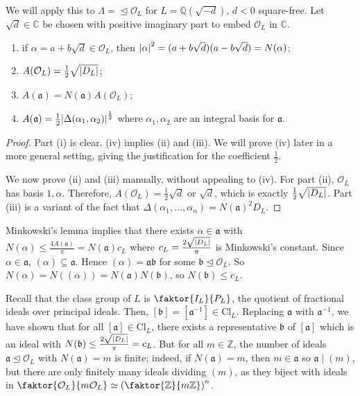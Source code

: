 We will apply this to \( \Lambda = \mathfrak \trianglelefteq \mathcal O_L \) for \( L = \mathbb Q(\sqrt{-d}) \), \( d < 0 \) square-free.
Let \( \sqrt{d} \in \mathbb C \) be chosen with positive imaginary part to embed \( \mathcal O_L \) in \( \mathbb C \).
\begin{lemma}
    \begin{enumerate}
        \item if \( \alpha = a + b \sqrt{d} \in \mathcal O_L \), then \( \abs{\alpha}^2 = (a+b\sqrt{d})(a-b\sqrt{d}) = N(\alpha) \);
        \item \( A(\mathcal O_L) = \frac{1}{2}\sqrt{\abs{D_L}} \);
        \item \( A(\mathfrak a) = N(\mathfrak a) A(\mathcal O_L) \);
        \item \( A(\mathfrak a) = \frac{1}{2} \abs{\Delta(\alpha_1, \alpha_2)}^{\frac{1}{2}} \) where \( \alpha_1, \alpha_2 \) are an integral basis for \( \mathfrak a \).
    \end{enumerate}
\end{lemma}
\begin{proof}
    Part (i) is clear.
    (iv) implies (ii) and (iii).
    We will prove (iv) later in a more general setting, giving the justification for the coefficient \( \frac{1}{2} \).
    
    We now prove (ii) and (iii) manually, without appealing to (iv).
    For part (ii), \( \mathcal O_L \) has basis \( 1, \alpha \).
    Therefore, \( A(\mathcal O_L) = \frac{1}{2}\sqrt{d} \) or \( \sqrt{d} \), which is exactly \( \frac{1}{2} \sqrt{\abs{D_L}} \).
    Part (iii) is a variant of the fact that \( \Delta(\alpha_1, \dots, \alpha_n) = N(\mathfrak a)^2 D_L \).
\end{proof}
Minkowski's lemma implies that there exists \( \alpha \in \mathfrak a \) with \( N(\alpha) \leq \frac{4A(\mathfrak a)}{\pi} = N(\mathfrak a) c_L \) where \( c_L = \frac{2\sqrt{\abs{D_L}}}{\pi} \) is Minkowski's constant.
Since \( \alpha \in \mathfrak a \), \( (\alpha) \subseteq \mathfrak a \).
Hence \( (\alpha) = \mathfrak a \mathfrak b \) for some \( \mathfrak b \trianglelefteq \mathcal O_L \).
So \( N(\alpha) = N((\alpha)) = N(\mathfrak a) N(\mathfrak b) \), so \( N(\mathfrak b) \leq c_L \).

Recall that the class group of \( L \) is \( \faktor{I_L}{P_L} \), the quotient of fractional ideals over principal ideals.
Then, \( [\mathfrak b] = [\mathfrak a^{-1}] \in \mathrm{Cl}_L \).
Replacing \( \mathfrak a \) with \( \mathfrak a^{-1} \), we have shown that for all \( [\mathfrak a] \in \mathrm{Cl}_L \), there exists a representative \( \mathfrak b \) of \( [\mathfrak a] \) which is an ideal with \( N(\mathfrak b) \leq \frac{2\sqrt{\abs{D_L}}}{\pi} = c_L \).
But for all \( m \in \mathbb Z \), the number of ideals \( \mathfrak a \trianglelefteq \mathcal O_L \) with \( N(\mathfrak a) = m \) is finite; indeed, if \( N(\mathfrak a) = m \), then \( m \in \mathfrak a \) so \( \mathfrak a \mid (m) \), but there are only finitely many ideals dividing \( (m) \), as they biject with ideals in \( \faktor{\mathcal O_L}{m\mathcal O_L} \simeq \qty(\faktor{\mathbb Z}{m\mathbb Z})^n \).

